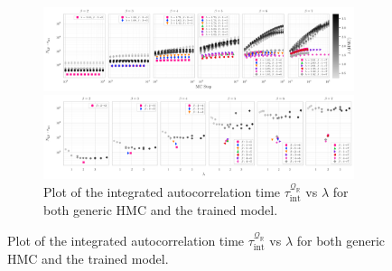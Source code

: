 \documentclass{article} %
\begin{document}
\begin{figure}[htpb]
   \centering
   \begin{subfigure}{\linewidth}
      \includegraphics[width=\linewidth]{figures/autocorr_vs_mc_step1.pdf}
      \caption{Plot of the integrated autocorrelation time \(\tau_{\mathrm{int}}^{\mathcal{Q}_{\mathbb{R}}}\) vs
      MC step for both generic HMC and the trained model, for \(\beta = 2, 3, \ldots, 7\) arranged from left to right.}
      \includegraphics[width=\linewidth]{figures/autocorr_vs_traj_len1.pdf}
      \caption{Plot of the integrated autocorrelation time \(\tau_{\mathrm{int}}^{\mathcal{Q}_{\mathbb{R}}}\) vs
      \(\lambda\) for both generic HMC and the trained model.}
   \end{subfigure}
\end{figure}
%
%
\end{document}
